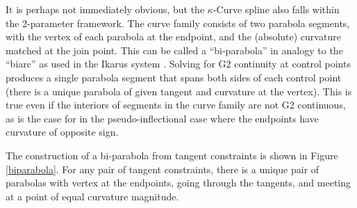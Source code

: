 \documentclass{article}
\newcommand{\kcurve}{$\kappa$-Curve}
\begin{document}
It is perhaps not immediately obvious, but the \kcurve{} spline also falls within the 2-parameter framework. The curve family consists of two parabola segments, with the vertex of each parabola at the endpoint, and the (absolute) curvature matched at the join point. This can be called a ``bi-parabola'' in analogy to the ``biarc'' as used in the Ikarus system \cite{Karow87}. Solving for G2 continuity at control points produces a single parabola segment that spans both sides of each control point (there is a unique parabola of given tangent and curvature at the vertex). This is true even if the interiors of segments in the curve family are not G2 continuous, as is the case for in the pseudo-inflectional case where the endpoints have curvature of opposite sign.

The construction of a bi-parabola from tangent constraints is shown in Figure \ref{biparabola}. For any pair of tangent constraints, there is a unique pair of parabolas with vertex at the endpoints, going through the tangents, and meeting at a point of equal curvature magnitude.
\end{document}

